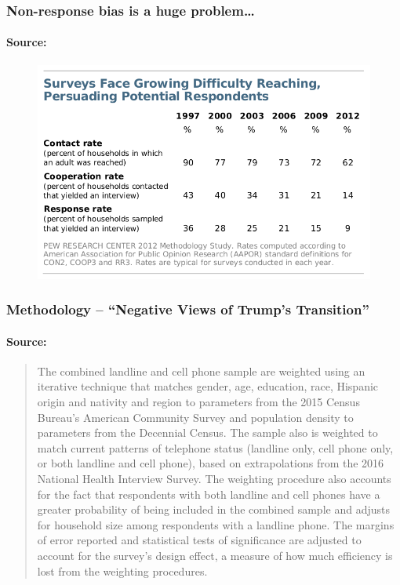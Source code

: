 \begin{frame}
  \frametitle{Non-response bias is a huge problem\dots}
  \framesubtitle{Source: \href{http://www.people-press.org/2012/05/15/assessing-the-representativeness-of-public-opinion-surveys}{}}

  \begin{figure}
    \centering
\includegraphics[scale = 0.3]{./images/pew_nonresponse_2012.png}
\end{figure}

\end{frame}
\begin{frame}
  \frametitle{Methodology -- ``Negative Views of Trump's Transition''}
  \framesubtitle{Source: \href{http://www.people-press.org/2017/01/10/negative-views-of-trumps-transition-amid-concerns-about-conflicts-tax-returns/2/}{}}
  \begin{quote}
    \footnotesize
    The combined landline and cell phone sample are \alert{weighted using an iterative technique that matches gender, age, education, race, Hispanic origin and nativity and region to parameters from the 2015 Census Bureau’s American Community Survey} and population density to parameters from the Decennial Census. The sample also is weighted to match current patterns of telephone status (landline only, cell phone only, or both landline and cell phone), based on extrapolations from the 2016 National Health Interview Survey. The weighting procedure also accounts for the fact that respondents with both landline and cell phones have a greater probability of being included in the combined sample and adjusts for household size among respondents with a landline phone. The margins of error reported and statistical tests of significance are adjusted to account for the survey’s design effect, a measure of how much efficiency is lost from the weighting procedures.
  \end{quote}
\end{frame}
